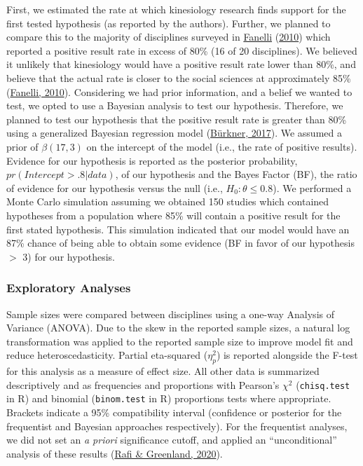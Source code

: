 \documentclass[]{cik}%
\begin{document}
First, we estimated the rate at which kinesiology research finds support
for the first tested hypothesis (as reported by the authors). Further,
we planned to compare this to the majority of disciplines surveyed in
\protect\hyperlink{ref-fanelli_positive_2010}{Fanelli}
(\protect\hyperlink{ref-fanelli_positive_2010}{2010}) which reported a
positive result rate in excess of 80\% (16 of 20 disciplines). We
believed it unlikely that kinesiology would have a positive result rate
lower than 80\%, and believe that the actual rate is closer to the
social sciences at approximately 85\%
(\protect\hyperlink{ref-fanelli_positive_2010}{Fanelli, 2010}).
Considering we had prior information, and a belief we wanted to test, we
opted to use a Bayesian analysis to test our hypothesis. Therefore, we
planned to test our hypothesis that the positive result rate is greater
than 80\% using a generalized Bayesian regression model
(\protect\hyperlink{ref-Burkner_2017}{Bürkner, 2017}). We assumed a
prior of \(\beta(17,3)\) on the intercept of the model (i.e., the rate
of positive results). Evidence for our hypothesis is reported as the
posterior probability, \(pr(Intercept > .8 | data)\), of our hypothesis
and the Bayes Factor (BF), the ratio of evidence for our hypothesis
versus the null (i.e., \(H_0: \theta \le 0.8\)). We performed a Monte
Carlo simulation assuming we obtained 150 studies which contained
hypotheses from a population where 85\% will contain a positive result
for the first stated hypothesis. This simulation indicated that our
model would have an 87\% chance of being able to obtain some evidence
(BF in favor of our hypothesis \(>\) 3) for our hypothesis.

\hypertarget{exploratory-analyses}{%
\subsubsection{Exploratory Analyses}\label{exploratory-analyses}}

Sample sizes were compared between disciplines using a one-way Analysis
of Variance (ANOVA). Due to the skew in the reported sample sizes, a
natural log transformation was applied to the reported sample size to
improve model fit and reduce heteroscedasticity. Partial eta-squared
(\(\eta^2_{p}\)) is reported alongside the F-test for this analysis as a
measure of effect size. All other data is summarized descriptively and
as frequencies and proportions with Pearson's \(\chi^2\)
(\texttt{chisq.test} in R) and binomial (\texttt{binom.test} in R)
proportions tests where appropriate. Brackets indicate a 95\%
compatibility interval (confidence or posterior for the frequentist and
Bayesian approaches respectively). For the frequentist analyses, we did
not set an \emph{a priori} significance cutoff, and applied an
``unconditional'' analysis of these results
(\protect\hyperlink{ref-rafi2020semantic}{Rafi \& Greenland, 2020}).
\end{document}
